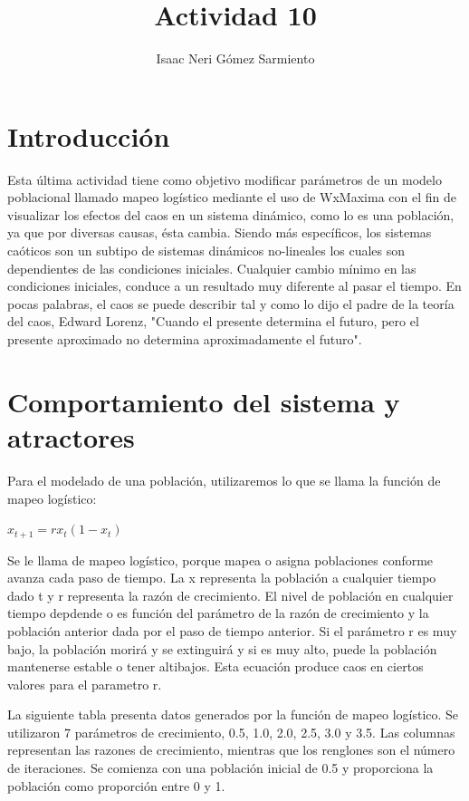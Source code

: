 \documentclass[a4paper]{article}
\title{Actividad 10}
\author{Isaac Neri Gómez Sarmiento}
\begin{document}
\maketitle


\section{Introducción}
Esta última actividad tiene como objetivo modificar parámetros de un modelo poblacional llamado mapeo logístico mediante el uso de WxMaxima con el fin de visualizar los efectos del caos en un sistema dinámico, como lo es una población, ya que por diversas causas, ésta cambia. Siendo más específicos, los sistemas caóticos son un subtipo de sistemas dinámicos no-lineales los cuales son dependientes de las condiciones iniciales. Cualquier cambio mínimo en las condiciones iniciales, conduce a un resultado muy diferente al pasar el tiempo. En pocas palabras, el caos se puede describir tal y como lo dijo el padre de la teoría del caos, Edward Lorenz, "Cuando el presente determina el futuro, pero el presente aproximado no determina aproximadamente el futuro".


\section{Comportamiento del sistema y atractores}

Para el modelado de una población, utilizaremos lo que se llama la función de mapeo logístico:\\

\begin{center}
$x_{t+1}=rx_t(1-x_t)$
\end{center}

Se le llama de mapeo logístico, porque mapea o asigna poblaciones conforme avanza cada paso de tiempo. La x representa la población a cualquier tiempo dado t y r representa la razón de crecimiento. El nivel de población en cualquier tiempo depdende o es función del parámetro de la razón de crecimiento  y la población anterior dada por el paso de tiempo anterior. 
Si el parámetro r es muy bajo, la población morirá y se extinguirá y si es muy alto, puede la población mantenerse estable o tener altibajos. Esta ecuación produce caos en ciertos valores para el parametro r.


La siguiente tabla presenta datos generados por la función de mapeo logístico. Se utilizaron 7 parámetros de crecimiento, 0.5, 1.0, 2.0, 2.5, 3.0 y 3.5.
Las columnas representan las razones de crecimiento, mientras que los renglones son el número de iteraciones. Se comienza con una población inicial de 0.5 y proporciona la población como proporción entre 0 y 1.
\end{document}
